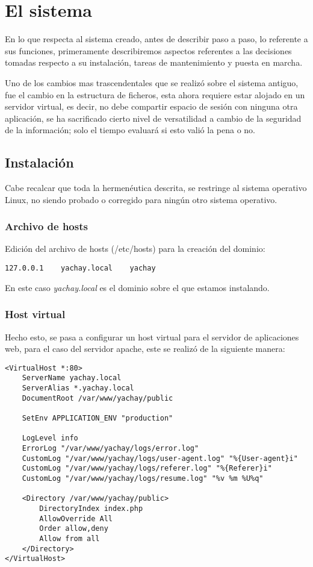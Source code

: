 \chapter{El sistema}

En lo que respecta al sistema creado, antes de describir paso a paso, lo referente a sus funciones, primeramente describiremos aspectos referentes a las decisiones tomadas respecto a su instalación, tareas de mantenimiento y puesta en marcha.

Uno de los cambios mas trascendentales que se realizó sobre el sistema antiguo, fue el cambio en la estructura de ficheros, esta ahora requiere estar alojado en un servidor virtual, es decir, no debe
compartir espacio de sesión con ninguna otra aplicación, se ha sacrificado cierto nivel de versatilidad a cambio de la seguridad de la información; solo el tiempo evaluará si esto valió la pena o no.

\section{Instalación}
Cabe recalcar que toda la hermenéutica descrita, se restringe al sistema operativo Linux, no siendo probado o corregido para ningún otro sistema operativo.

\subsection{Archivo de hosts}
Edición del archivo de hosts (/etc/hosts) para la creación del dominio:

\small
\begin{verbatim}
127.0.0.1    yachay.local    yachay
\end{verbatim}

En este caso \emph{yachay.local} es el dominio sobre el que estamos instalando.

\subsection{Host virtual}
Hecho esto, se pasa a configurar un host virtual para el servidor de aplicaciones web, para el caso del servidor apache, este se realizó de la siguiente manera:

\small
\begin{verbatim}
<VirtualHost *:80>
    ServerName yachay.local
    ServerAlias *.yachay.local
    DocumentRoot /var/www/yachay/public

    SetEnv APPLICATION_ENV "production"

    LogLevel info
    ErrorLog "/var/www/yachay/logs/error.log"
    CustomLog "/var/www/yachay/logs/user-agent.log" "%{User-agent}i"
    CustomLog "/var/www/yachay/logs/referer.log" "%{Referer}i"
    CustomLog "/var/www/yachay/logs/resume.log" "%v %m %U%q"

    <Directory /var/www/yachay/public>
        DirectoryIndex index.php
        AllowOverride All
        Order allow,deny
        Allow from all
    </Directory>
</VirtualHost>
\end{verbatim}

